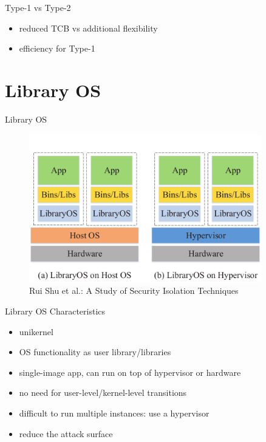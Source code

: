\documentclass{curs}
\begin{document}
\begin{frame}{Type-1 vs Type-2}
  \begin{itemize}
    \item reduced TCB vs additional flexibility
    \item efficiency for Type-1
  \end{itemize}
\end{frame}
\section{Library OS}

\begin{frame}{Library OS}
  \begin{figure}
    \centering
    \includegraphics[width=0.9\textwidth]{img/library-os} \\
    {\tiny Rui Shu et al.: A Study of Security Isolation Techniques}
  \end{figure}
\end{frame}

\begin{frame}{Library OS Characteristics}
  \begin{itemize}
    \item unikernel
    \item OS functionality as user library/libraries
    \item single-image app, can run on top of hypervisor or hardware
    \item no need for user-level/kernel-level transitions
    \item difficult to run multiple instances: use a hypervisor
    \item reduce the attack surface
  \end{itemize}
\end{frame}
\end{document}
